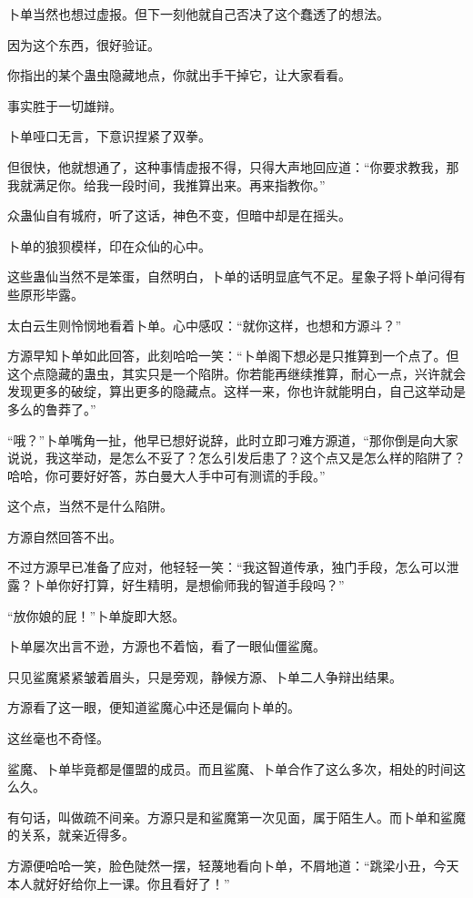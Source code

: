 \begin{this_body}
卜单当然也想过虚报。但下一刻他就自己否决了这个蠢透了的想法。

因为这个东西，很好验证。

你指出的某个蛊虫隐藏地点，你就出手干掉它，让大家看看。

事实胜于一切雄辩。

卜单哑口无言，下意识捏紧了双拳。

但很快，他就想通了，这种事情虚报不得，只得大声地回应道：“你要求教我，那我就满足你。给我一段时间，我推算出来。再来指教你。”

众蛊仙自有城府，听了这话，神色不变，但暗中却是在摇头。

卜单的狼狈模样，印在众仙的心中。

这些蛊仙当然不是笨蛋，自然明白，卜单的话明显底气不足。星象子将卜单问得有些原形毕露。

太白云生则怜悯地看着卜单。心中感叹：“就你这样，也想和方源斗？”

方源早知卜单如此回答，此刻哈哈一笑：“卜单阁下想必是只推算到一个点了。但这个点隐藏的蛊虫，其实只是一个陷阱。你若能再继续推算，耐心一点，兴许就会发现更多的破绽，算出更多的隐藏点。这样一来，你也许就能明白，自己这举动是多么的鲁莽了。”

“哦？”卜单嘴角一扯，他早已想好说辞，此时立即刁难方源道，“那你倒是向大家说说，我这举动，是怎么不妥了？怎么引发后患了？这个点又是怎么样的陷阱了？哈哈，你可要好好答，苏白曼大人手中可有测谎的手段。”

这个点，当然不是什么陷阱。

方源自然回答不出。

不过方源早已准备了应对，他轻轻一笑：“我这智道传承，独门手段，怎么可以泄露？卜单你好打算，好生精明，是想偷师我的智道手段吗？”

“放你娘的屁！”卜单旋即大怒。

卜单屡次出言不逊，方源也不着恼，看了一眼仙僵鲨魔。

只见鲨魔紧紧皱着眉头，只是旁观，静候方源、卜单二人争辩出结果。

方源看了这一眼，便知道鲨魔心中还是偏向卜单的。

这丝毫也不奇怪。

鲨魔、卜单毕竟都是僵盟的成员。而且鲨魔、卜单合作了这么多次，相处的时间这么久。

有句话，叫做疏不间亲。方源只是和鲨魔第一次见面，属于陌生人。而卜单和鲨魔的关系，就亲近得多。

方源便哈哈一笑，脸色陡然一摆，轻蔑地看向卜单，不屑地道：“跳梁小丑，今天本人就好好给你上一课。你且看好了！”


\end{this_body}
